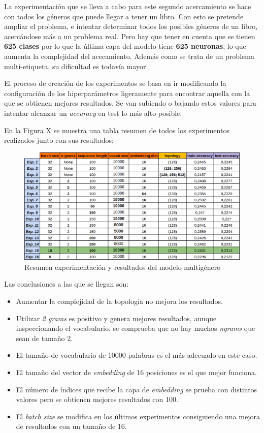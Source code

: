 \documentclass[12pt,a4paper, xcolor=table]{article}
\begin{document}
La experimentación que se lleva a cabo para este segundo acercamiento se hace con todos los géneros que puede llegar a tener un libro. Con esto se pretende ampliar el problema, e intentar determinar todos los posibles géneros de un libro, acercándose más a un problema real. Pero hay que tener en cuenta que se tienen \textbf{625 clases} por lo que la última capa del modelo tiene \textbf{625 neuronas}, lo que aumenta la complejidad del acecamiento. Además como se trata de un problema multi-etiqueta, su dificultad es todavía mayor.

\vspace{2mm}

El proceso de creación de los experimentos se basa en ir modificando la configuración de los hiperparámetros ligeramente para encontrar aquella con la que se obtienen mejores resultados. Se van subiendo o bajando estos valores para intentar alcanzar un \textit{accuracy} en test lo más alto posible.

\vspace{1mm}

En la Figura X se muestra una tabla resumen de todos los experimentos realizados junto con sus resultados:


\begin{figure}[!h]
    \centering
    \includegraphics[width=500px]{img/multi.png}
    \caption{Resumen experimentación y resultados del modelo multigénero}
\end{figure}

Las conclusiones a las que se llegan son:

\begin{itemize}
  \item Aumentar la complejidad de la topología no mejora los resultados.
  \item Utilizar \textit{2 grams} es positivo y genera mejores resultados, aunque inspeccionando el vocabulario, se comprueba que no hay muchos \textit{ngrams} que sean de tamaño 2.
  \item El tamaño de vocabulario de 10000 palabras es el más adecuado en este caso.
  \item El tamaño del vector de \textit{embedding} de 16 posiciones es el que mejor funciona.
  \item El número de índices que recibe la capa de \textit{embedding} se prueba con distintos valores pero se obtienen mejores resultados con 100.
  \item El \textit{batch size} se modifica en los últimos experimentos consiguiendo una mejora de resultados con un tamaño de 16.
\end{itemize}
\end{document}
